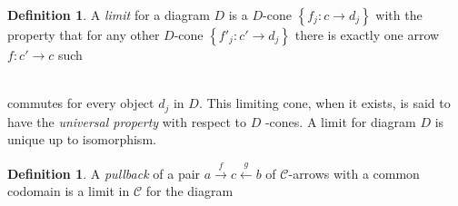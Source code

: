 \documentclass[10]{article}
\theoremstyle{plain}
\theoremstyle{definition}
\theoremstyle{definition}
\newtheorem{definition}[prop]{Definition}
\numberwithin{equation}{section}
\newcommand{\7}{\dagger}                     %
\newcommand{\8}{\bullet}                     %
\renewcommand{\.}{\cdot}                     %
\renewcommand{\:}{\colon}                    %
\renewcommand{\:}{\colon}           %
\begin{document}
\begin{appendices}
\begin{definition}
		
		A \textit{limit} for a diagram $D$ is a $D$-cone $\left\{f_j: c\to d_j\right\}$ with the property that for 
		any other $D$-cone $\left\{f'_j: c'\to d_j\right\}$ there is exactly one arrow $f:c' \to c$ such 
		\newline
		\\ 	
		commutes for every object $d_j$ in $D$. 
		This limiting cone, when it exists, is said to have the \textit{universal property} 
		with respect to $D$ -cones.
		A limit for 
		diagram $D$ is unique up to isomorphism.%
				
				
			\end{definition} 
			\begin{definition}\label{pull_back_defn}\cite{goldblatt:topoi}
				A \textit{pullback} of a pair $a \xrightarrow{f}c \xleftarrow{g} b$ of $\mathscr C$-arrows with a common codomain 
				is a limit in $\mathscr C$ for the diagram 
				\newline
				\\ 	
				
			\end{definition}
			

\end{appendices}
\end{document}

